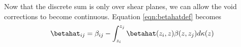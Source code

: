 Now that the discrete sum is only over shear planes, we can allow the void corrections to become continuous. Equation \ref{eqn:betahatdef} becomes
\begin{equation}
\label{eqn:betahatint}
\betahat_{i j} = \beta_{ i j} - \int_{z_i}^{z_j} \betahat(z_i, z) \beta(z, z_j) d\kappa(z)
\end{equation}
  
  
  
